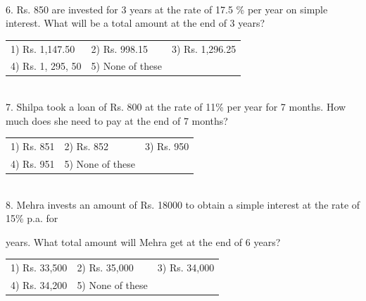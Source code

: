 \documentclass{article}
\begin{document}
	\noindent 
	
	\noindent 
	
	\noindent 
	
	\noindent \\  6.   Rs. 850 are invested for 3 years at the rate of 17.5 \% per year on simple interest. What will be a total amount at the end of 3 years?
	
	\noindent \begin{tabular}{p{1.7in} p{1.6in} p{1.6in}} \\ 
 1) Rs. 1,147.50           &  2) Rs. 998.15       &  3) Rs. 1,296.25    \\
4) Rs. 1, 295, 50  & 5) None of these  \\
\end{tabular}
	
	\noindent 
	
	\noindent \\  7.   Shilpa took a loan of Rs. 800 at the rate of 11\% per year for 7 months. How much does she need to pay at the end of 7 months?
	
	\noindent \begin{tabular}{p{1.7in} p{1.6in} p{1.6in}} \\ 
 1) Rs. 851                   &  2) Rs. 852            &  3) Rs. 950            \\
4) Rs. 951            & 5) None of these  \\
\end{tabular}
	
	\noindent 
	
	\noindent 
	
	\noindent 
	
	\noindent \\  8.   Mehra invests an amount of Rs. 18000 to obtain a simple interest at the rate of 15\% p.a. for
	
	\noindent 
	
	 years. What total amount will Mehra get at the end of 6 years?
	
	\noindent 
	
	\noindent \begin{tabular}{p{1.7in} p{1.6in} p{1.6in}} \\ 
 1) Rs. 33,500              &  2) Rs. 35,000       &  3) Rs. 34,000       \\
4) Rs. 34,200       & 5) None of these  \\
\end{tabular}
	
	\noindent 
	
\end{document}
